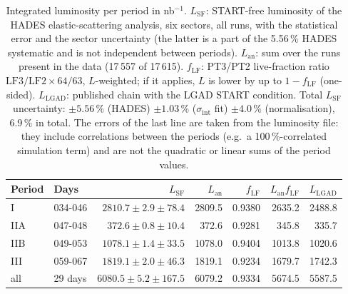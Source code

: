 \begin{table}[H]
\centering\small
\setlength{\tabcolsep}{4pt}
\caption{Integrated luminosity per period in nb$^{-1}$. $L_\mathrm{SF}$: START-free luminosity of the HADES elastic-scattering analysis, six sectors, all runs, with the statistical error and the sector uncertainty (the latter is a part of the 5.56\,\% HADES systematic and is not independent between periods). $L_\mathrm{an}$: sum over the runs present in the data (17\,557 of 17\,615). $f_\mathrm{LF}$: PT3/PT2 live-fraction ratio $\mathrm{LF3}/\mathrm{LF2}\times 64/63$, $L$-weighted; if it applies, $L$ is lower by up to $1-f_\mathrm{LF}$ (one-sided). $L_\mathrm{LGAD}$: published chain with the LGAD START condition. Total $L_\mathrm{SF}$ uncertainty: $\pm5.56\,\%$ (HADES) $\pm1.03\,\%$ ($\sigma_\mathrm{int}$ fit) $\pm4.0\,\%$ (normalisation), 6.9\,\% in total. The errors of the last line are taken from the luminosity file: they include correlations between the periods (e.g.\ a 100\,\%-correlated simulation term) and are not the quadratic or linear sums of the period values.}
\label{tab:smp_lumi}
\begin{tabular}{ll rr rr r}
\toprule
Period & Days & $L_\mathrm{SF}$ & $L_\mathrm{an}$ & $f_\mathrm{LF}$ & $L_\mathrm{an} f_\mathrm{LF}$ & $L_\mathrm{LGAD}$ \\
\midrule
I & 034-046 & $2810.7\pm2.9\pm78.4$ & 2809.5 & 0.9380 & 2635.2 & 2488.8 \\
IIA & 047-048 & $372.6\pm0.8\pm10.4$ & 372.6 & 0.9281 & 345.8 & 335.7 \\
IIB & 049-053 & $1078.1\pm1.4\pm33.5$ & 1078.0 & 0.9404 & 1013.8 & 1020.6 \\
III & 059-067 & $1819.1\pm2.0\pm46.3$ & 1819.1 & 0.9234 & 1679.7 & 1742.3 \\
\midrule
all & 29 days & $6080.5\pm5.2\pm167.5$ & 6079.2 & 0.9334 & 5674.5 & 5587.5 \\
\bottomrule
\end{tabular}
\end{table}

